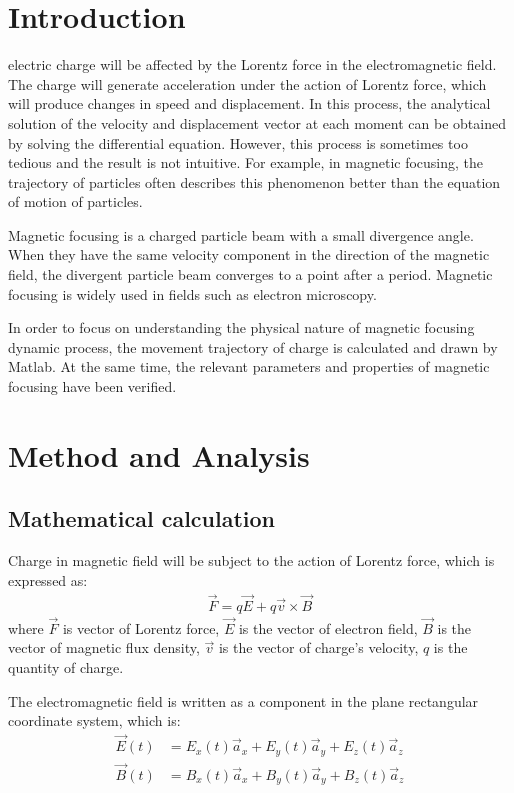 \documentclass[journal,twocolumn,letterpaper]{IEEEJERM}
\begin{document}
\IEEEpeerreviewmaketitle


\section{Introduction}

 electric charge will be affected by the Lorentz force in the electromagnetic field. The charge will generate acceleration under the action of Lorentz force, which will produce changes in speed and displacement. In this process, the analytical solution of the velocity and displacement vector at each moment can be obtained by solving the differential equation. However, this process is sometimes too tedious and the result is not intuitive. For example, in magnetic focusing, the trajectory of particles often describes this phenomenon better than the equation of motion of particles.

Magnetic focusing is a charged particle beam with a small divergence angle. When they have the same velocity component in the direction of the magnetic field, the divergent particle beam converges to a point after a period. Magnetic focusing is widely used in fields such as electron microscopy.\cite{num3}

 In order to focus on understanding the physical nature of  magnetic focusing dynamic process, the movement trajectory of charge is calculated and drawn by Matlab. At the same time, the relevant parameters and properties of magnetic focusing have been verified.
 
\section{Method and Analysis}
\subsection{Mathematical calculation
}
Charge in magnetic field will be subject to the action of Lorentz force, which is expressed as:
\begin{align}
\vec{F}=q\vec{E}+q\vec{v}\times \vec{B}
\end{align}
where $ \vec{F} $ is vector of Lorentz force, $ \vec{E}$ is the vector of electron field, $ \vec{B} $ is the vector of magnetic flux density, $ \vec{v} $ is the vector of charge's velocity, $ q $ is the quantity of charge.

The electromagnetic field is written as a component in the plane rectangular coordinate system, which is:
\begin{align}
\vec{E}(t)&=E_x(t)\vec{a}_x+E_y(t)\vec{a}_y+E_z(t)\vec{a}_z \\
\vec{B}(t)&=B_x(t)\vec{a}_x+B_y(t)\vec{a}_y+B_z(t)\vec{a}_z 
\end{align}
\end{document}
